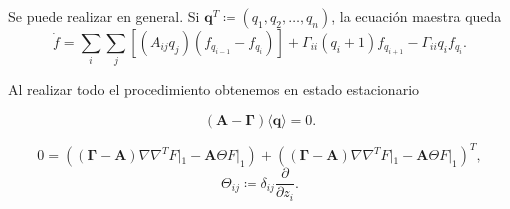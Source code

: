 \documentclass[xcolor=dvipsnames]{beamer}
\begin{document}
\begin{frame}
Se puede realizar en general. Si $\mathbf{q}^T \coloneqq (q_1,q_2,\dots,q_n)$,
la ecuaci\'on maestra queda
\begin{equation*}
\dot{f}= \sum_i\sum_j \left[\left(A_{ij}q_j\right) \left(f_{q_{i-1}} - f_{q_i}\right)\right] + \Gamma_{ii}(q_i+1)f_{q_{i+1}} -\Gamma_{ii}q_if_{q_i}.
\end{equation*}

Al realizar todo el procedimiento obtenemos en estado estacionario

$$\left(\mathbf{A} - \mathbf{\Gamma}\right)\langle \mathbf{q} \rangle = 0.$$

$$0 = \left( \left( \mathbf{\Gamma} - \mathbf{A}\right) \nabla\nabla^TF|_1 - \mathbf{A}\Theta F|_1 \right) +  \left( \left( \mathbf{\Gamma} - \mathbf{A}\right) \nabla\nabla^TF|_1 - \mathbf{A}\Theta F|_1\right)^T,$$ 
$$\Theta_{ij} \coloneqq \delta_{ij}\frac{\partial}{\partial z_i}.$$
\end{frame}


\end{document}
